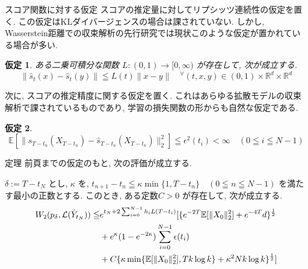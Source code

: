 \documentclass[11pt]{beamer}
\theoremstyle{plain}
\newtheorem{assumption}{仮定}
\theoremstyle{definition}
\newcommand{\E}{\mathbb{E}}
\begin{document}
    \begin{frame}{スコア関数に対する仮定}
      スコアの推定量に対してリプシッツ連続性の仮定を置く. この仮定はKLダイバージェンスの場合は課されていない. しかし, Wasserstein距離での収束解析の先行研究では現状このような仮定が置かれている場合が多い.
      \begin{assumption}
          ある二乗可積分な関数 $L:(0,1)\rightarrow [0,\infty)$ が存在して, 次が成立する.
          \begin{equation}
              \|\hat{s}_t(x)-\hat{s}_t(y)\|\leqq L(t)\|x-y\| \quad  ^{\forall}(t,x,y)\in (0,1)\times \mathbb{R}^d\times \mathbb{R}^d
          \end{equation}
      \end{assumption}
      次に, スコアの推定精度に関する仮定を置く. これはあらゆる拡散モデルの収束解析で課されているものであり, 学習の損失関数の形からも自然な仮定である.
      \begin{assumption}
          \begin{equation}
              \mathbb{E}[\|s_{T-t_n}(X_{T-t_n})-\hat{s}_{T-t_n}(X_{T-t_n})\|_2^2]\leqq \epsilon^2(t_i)<\infty\quad (0\leqq i \leqq N-1)
          \end{equation}
      \end{assumption}
    \end{frame}
    \begin{frame}{定理}
      前頁までの仮定のもと, 次の評価が成立する.
      \begin{theorem}
        $\delta:=T-t_N$ とし, $\kappa$ を,  $t_{n+1}-t_n\leqq\kappa\min\{1,T-t_n\}\quad (0\leqq n\leqq N-1)$ を満たす最小の正数とする. 
        このとき, ある定数$C>0$ が存在して, 次が成立する.
        \begin{align}
            W_2(p_{\delta}, \mathcal{L}(\hat{Y}_{t_N}))\leqq& e^{t_N+2\sum_{i=0}^{N-1}h_iL(T-t_i)}[\{e^{-2T}\E[\|X_0\|_2^2]+e^{-4T}d\}^{\frac{1}{2}}\notag\\
            &+e^\kappa(1-e^{-2\kappa})\sum_{i=0}^{N-1}\epsilon(t_i)\notag\\
            &+C\{\kappa\min\{\E[\|X_0\|_2^2],Tk\log{k}\}+\kappa^2Nk\log{k}\}^\frac{1}{2}]
        \end{align}
      \end{theorem}
    \end{frame}
\end{document}
